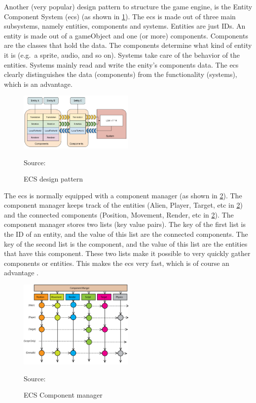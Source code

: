 \documentclass{projdoc}
\begin{document}
Another (very popular) design pattern to structure the game engine, is the Entity
Component System (\gls{ecs}) (as shown in \cref{fig:ECS Block Diagram}). The
\gls{ecs} is made out of three main subsystems, namely entities, components and
systems. Entities are just IDs. An entity is made out of a gameObject and one (or
more) components. Components are the classes that hold the data. The components
determine what kind of entity it is (e.g.~a sprite, audio, and so on). Systems take
care of the behavior of the entities. Systems mainly read and write the enity's
components data. The \gls{ecs} clearly distinguishes the data (components) from the
functionality (systems), which is an advantage.

\begin{figure}
	\centering
	\includegraphics[width=0.5\textwidth]{img/ECSBlockDiagram.png}
	\caption{ECS design pattern}
	Source: \autocite{img:ECSBlockDiagram}
	\label{fig:ECS Block Diagram}
\end{figure}

The \gls{ecs} is normally equipped with a component manager (as shown in
\cref{fig:ECS Component manager}). The component manager keeps track of the entities
(Alien, Player, Target, etc in \cref{fig:ECS Component manager}) and the connected
components (Position, Movement, Render, etc in \cref{fig:ECS Component manager}). The
component manager stores two lists (key value pairs). The key of the first list is
the ID of an entity, and the value of this list are the connected components. The key
of the second list is the component, and the value of this list are the entities that
have this component. These two lists make it possible to very quickly gather
components or entities. This makes the \gls{ecs} very fast, which is of course an
advantage \autocite{man:ECSComponentManager}.

\begin{figure}
	\centering
	\includegraphics[width=0.5\textwidth]{img/ECSComponentManager.png}
	\caption{ECS Component manager}
	Source: \autocite{img:ECSComponentSystem}
	\label{fig:ECS Component manager}
\end{figure}
\end{document}
